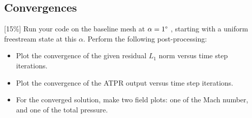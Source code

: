 \pagebreak
\subsection{Convergences}
[15\%] Run your code on the baseline mesh at $\alpha = 1\degree$ , starting with a uniform freestream state at this $\alpha$. Perform the following post-processing:

\begin{itemize}
    \item Plot the convergence of the given residual $L_1$ norm versus time step iterations.
    \item Plot the convergence of the ATPR output versus time step iterations.
    \item For the converged solution, make two field plots: one of the Mach number, and one of the total pressure.
\end{itemize}